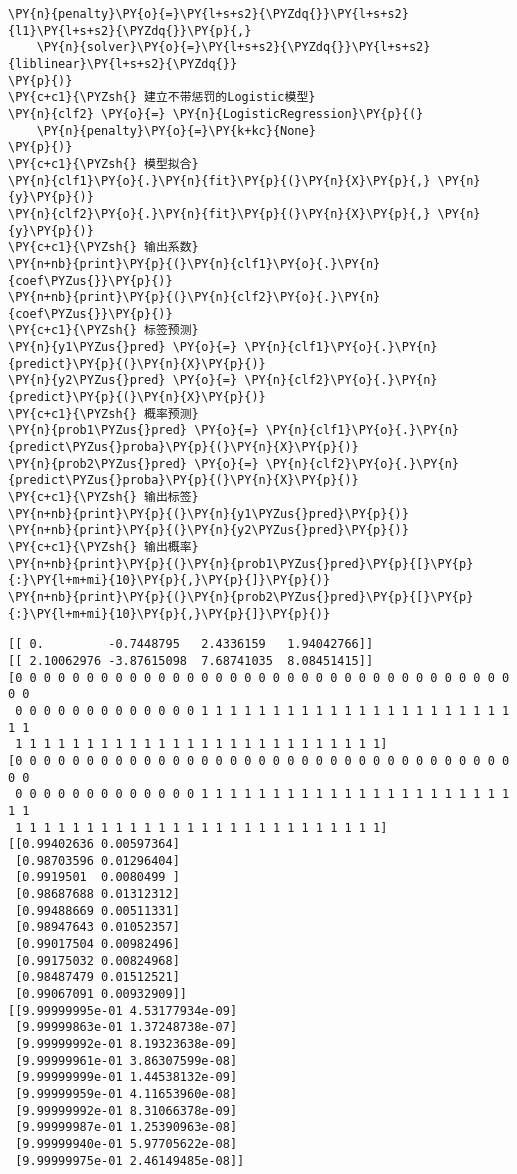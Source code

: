 \begin{Verbatim}[commandchars=\\\{\}]
    \PY{n}{penalty}\PY{o}{=}\PY{l+s+s2}{\PYZdq{}}\PY{l+s+s2}{l1}\PY{l+s+s2}{\PYZdq{}}\PY{p}{,}
    \PY{n}{solver}\PY{o}{=}\PY{l+s+s2}{\PYZdq{}}\PY{l+s+s2}{liblinear}\PY{l+s+s2}{\PYZdq{}}
\PY{p}{)}
\PY{c+c1}{\PYZsh{} 建立不带惩罚的Logistic模型}
\PY{n}{clf2} \PY{o}{=} \PY{n}{LogisticRegression}\PY{p}{(}
    \PY{n}{penalty}\PY{o}{=}\PY{k+kc}{None}
\PY{p}{)}
\PY{c+c1}{\PYZsh{} 模型拟合}
\PY{n}{clf1}\PY{o}{.}\PY{n}{fit}\PY{p}{(}\PY{n}{X}\PY{p}{,} \PY{n}{y}\PY{p}{)}
\PY{n}{clf2}\PY{o}{.}\PY{n}{fit}\PY{p}{(}\PY{n}{X}\PY{p}{,} \PY{n}{y}\PY{p}{)}
\PY{c+c1}{\PYZsh{} 输出系数}
\PY{n+nb}{print}\PY{p}{(}\PY{n}{clf1}\PY{o}{.}\PY{n}{coef\PYZus{}}\PY{p}{)}
\PY{n+nb}{print}\PY{p}{(}\PY{n}{clf2}\PY{o}{.}\PY{n}{coef\PYZus{}}\PY{p}{)}
\PY{c+c1}{\PYZsh{} 标签预测}
\PY{n}{y1\PYZus{}pred} \PY{o}{=} \PY{n}{clf1}\PY{o}{.}\PY{n}{predict}\PY{p}{(}\PY{n}{X}\PY{p}{)}
\PY{n}{y2\PYZus{}pred} \PY{o}{=} \PY{n}{clf2}\PY{o}{.}\PY{n}{predict}\PY{p}{(}\PY{n}{X}\PY{p}{)}
\PY{c+c1}{\PYZsh{} 概率预测}
\PY{n}{prob1\PYZus{}pred} \PY{o}{=} \PY{n}{clf1}\PY{o}{.}\PY{n}{predict\PYZus{}proba}\PY{p}{(}\PY{n}{X}\PY{p}{)}
\PY{n}{prob2\PYZus{}pred} \PY{o}{=} \PY{n}{clf2}\PY{o}{.}\PY{n}{predict\PYZus{}proba}\PY{p}{(}\PY{n}{X}\PY{p}{)}
\PY{c+c1}{\PYZsh{} 输出标签}
\PY{n+nb}{print}\PY{p}{(}\PY{n}{y1\PYZus{}pred}\PY{p}{)}
\PY{n+nb}{print}\PY{p}{(}\PY{n}{y2\PYZus{}pred}\PY{p}{)}
\PY{c+c1}{\PYZsh{} 输出概率}
\PY{n+nb}{print}\PY{p}{(}\PY{n}{prob1\PYZus{}pred}\PY{p}{[}\PY{p}{:}\PY{l+m+mi}{10}\PY{p}{,}\PY{p}{]}\PY{p}{)}
\PY{n+nb}{print}\PY{p}{(}\PY{n}{prob2\PYZus{}pred}\PY{p}{[}\PY{p}{:}\PY{l+m+mi}{10}\PY{p}{,}\PY{p}{]}\PY{p}{)}
\end{Verbatim}

\begin{Verbatim}[commandchars=\\\{\}]
[[ 0.         -0.7448795   2.4336159   1.94042766]]
[[ 2.10062976 -3.87615098  7.68741035  8.08451415]]
[0 0 0 0 0 0 0 0 0 0 0 0 0 0 0 0 0 0 0 0 0 0 0 0 0 0 0 0 0 0 0 0 0 0 0 0 0
 0 0 0 0 0 0 0 0 0 0 0 0 0 1 1 1 1 1 1 1 1 1 1 1 1 1 1 1 1 1 1 1 1 1 1 1 1
 1 1 1 1 1 1 1 1 1 1 1 1 1 1 1 1 1 1 1 1 1 1 1 1 1 1]
[0 0 0 0 0 0 0 0 0 0 0 0 0 0 0 0 0 0 0 0 0 0 0 0 0 0 0 0 0 0 0 0 0 0 0 0 0
 0 0 0 0 0 0 0 0 0 0 0 0 0 1 1 1 1 1 1 1 1 1 1 1 1 1 1 1 1 1 1 1 1 1 1 1 1
 1 1 1 1 1 1 1 1 1 1 1 1 1 1 1 1 1 1 1 1 1 1 1 1 1 1]
[[0.99402636 0.00597364]
 [0.98703596 0.01296404]
 [0.9919501  0.0080499 ]
 [0.98687688 0.01312312]
 [0.99488669 0.00511331]
 [0.98947643 0.01052357]
 [0.99017504 0.00982496]
 [0.99175032 0.00824968]
 [0.98487479 0.01512521]
 [0.99067091 0.00932909]]
[[9.99999995e-01 4.53177934e-09]
 [9.99999863e-01 1.37248738e-07]
 [9.99999992e-01 8.19323638e-09]
 [9.99999961e-01 3.86307599e-08]
 [9.99999999e-01 1.44538132e-09]
 [9.99999959e-01 4.11653960e-08]
 [9.99999992e-01 8.31066378e-09]
 [9.99999987e-01 1.25390963e-08]
 [9.99999940e-01 5.97705622e-08]
 [9.99999975e-01 2.46149485e-08]]
\end{Verbatim}
